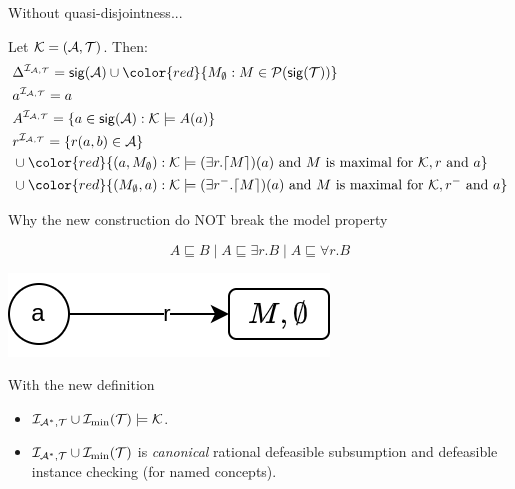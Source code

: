\documentclass[10pt]{beamer}
\newcommand{\fullminmod}{\ensuremath{\Imc_{\Amc^{*}, \Tmc}} \cup \Imc_{\min}(\Tmc)}
\begin{document}
\begin{frame}{Without quasi-disjointness...}
\begin{definition}
    \label{def:abint}
    Let $\mathcal{K} = (\mathcal{A}, \mathcal{T})$. Then:
    \begin{align*}
        & \Delta^{\Aint}  = \sig{\Amc} \cup {\color{red} \{\typel{M}{\emptyset} : M \in \Pmc (\sig{\Tmc})\}} \\
        & a^{\Aint} = a \\
        & A^{\Aint} = \{a \in \sig{\Amc} : \Kmc \models A(a) \}  \\ 
        & r^{\Aint} = \{r(a,b) \in \Amc \} \\ 
        & \cup {\color{red}\{(a, \typel{M}{\emptyset}) : \Kmc \models (\exists r.\setconj{M})(a) \textrm{ and $M$ is maximal for $\Kmc, r$ and $a$}\}} \\ & \cup {\color{red}\{(\typel{M}{\emptyset}, a) : \Kmc \models (\exists r^-.\setconj{M})(a) \textrm{ and $M$ is maximal for $\Kmc, r^{-}$ and $a$}\}}
    \end{align*}
\end{definition}
\end{frame}

\begin{frame}{Why the new construction do NOT break the model property}

  \[ A \sqsubseteq B \mid A \sqsubseteq \exists r.B \mid A \sqsubseteq \forall r.B\]

\vspace{0.5cm}

  {\begin{center}
  \includegraphics[scale=0.37]{img/simple.png}
  \end{center}}

  \pause 
  \vspace{0.5cm}

  With the new definition 

  \begin{itemize}
    \item $\fullminmod \models \Kmc$.
    \item $\fullminmod$ is \emph{canonical} \wrt rational defeasible subsumption and defeasible instance checking (for named concepts).
  \end{itemize}


\end{frame}
\end{document}
